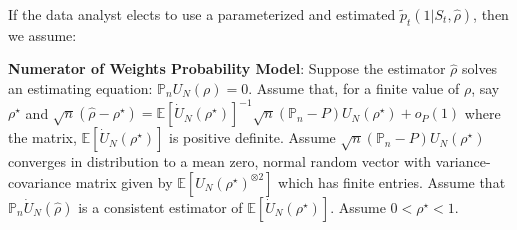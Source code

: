 \documentclass[supplementary, lineno]{biometrika}
\def\E{\mathbb{E}}
\def\P{\mathbb{P}}
\begin{document}
If the data analyst elects to use a parameterized and estimated $\tilde p_t(1|S_t,\hat \rho)$, then we assume:

\textbf{Numerator of Weights Probability Model}: Suppose the estimator $\hat\rho$ solves an estimating equation: $\P_n U_N(\rho)=0$. Assume that, for a finite value of $\rho$, say $\rho^\star$ and $\sqrt{n}(\hat\rho-\rho^\star)= \E \left[\dot U_N (\rho^\star) \right]^{-1}\sqrt{n}(\P_n-P) U_N (\rho^\star) + o_P(1)$ where the matrix, $\E \left[\dot U_N (\rho^\star) \right]$ is positive definite. Assume $\sqrt{n}(\P_n-P) U_N (\rho^\star)$ converges in distribution to a mean zero, normal random vector with variance-covariance matrix given by $\E[U_N(\rho^\star)^ {\otimes 2}]$ which has finite entries. Assume that $\P_n \dot U_N(\hat\rho)$ is a consistent estimator of $\E[\dot U_N(\rho^\star)]$. Assume $0 <\rho^\star <1$.
\end{document}
